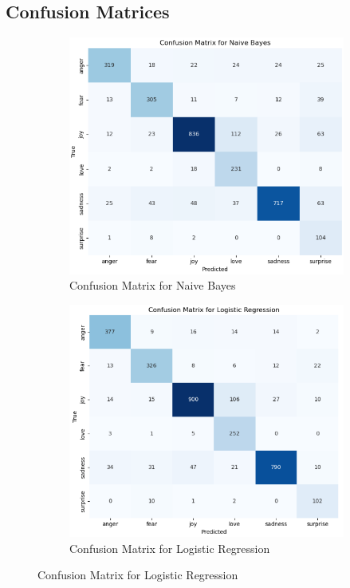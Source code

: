 \clearpage



\subsection{Confusion Matrices}

\begin{figure}[h!]
	\centering
	\begin{subfigure}[b]{0.45\textwidth}
		\centering
		\includegraphics[width=\textwidth]{images/confusion_matrix_01.png}
		\caption{Confusion Matrix for Naive Bayes}
		\label{fig:final_confusion_matrix_naive_bayes}
	\end{subfigure}
	\hfill
	\begin{subfigure}[b]{0.45\textwidth}
		\centering
		\includegraphics[width=\textwidth]{images/confusion_matrix_01.1.png}
		\caption{Confusion Matrix for Logistic Regression}
		\label{fig:final_confusion_matrix_logistic_regression}
	\end{subfigure}
	

\end{figure}
